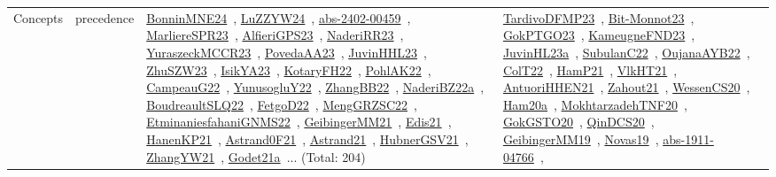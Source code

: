 {\begin{longtable}{lp{3cm}>{\raggedright\arraybackslash}p{6cm}>{\raggedright\arraybackslash}p{6cm}>{\raggedright\arraybackslash}p{8cm}}
Concepts & precedence & \href{../works/BonninMNE24.pdf}{BonninMNE24}~\cite{BonninMNE24}, \href{../works/LuZZYW24.pdf}{LuZZYW24}~\cite{LuZZYW24}, \href{../works/abs-2402-00459.pdf}{abs-2402-00459}~\cite{abs-2402-00459}, \href{../works/MarliereSPR23.pdf}{MarliereSPR23}~\cite{MarliereSPR23}, \href{../works/AlfieriGPS23.pdf}{AlfieriGPS23}~\cite{AlfieriGPS23}, \href{../works/NaderiRR23.pdf}{NaderiRR23}~\cite{NaderiRR23}, \href{../works/YuraszeckMCCR23.pdf}{YuraszeckMCCR23}~\cite{YuraszeckMCCR23}, \href{../works/PovedaAA23.pdf}{PovedaAA23}~\cite{PovedaAA23}, \href{../works/JuvinHHL23.pdf}{JuvinHHL23}~\cite{JuvinHHL23}, \href{../works/ZhuSZW23.pdf}{ZhuSZW23}~\cite{ZhuSZW23}, \href{../works/IsikYA23.pdf}{IsikYA23}~\cite{IsikYA23}, \href{../works/KotaryFH22.pdf}{KotaryFH22}~\cite{KotaryFH22}, \href{../works/PohlAK22.pdf}{PohlAK22}~\cite{PohlAK22}, \href{../works/CampeauG22.pdf}{CampeauG22}~\cite{CampeauG22}, \href{../works/YunusogluY22.pdf}{YunusogluY22}~\cite{YunusogluY22}, \href{../works/ZhangBB22.pdf}{ZhangBB22}~\cite{ZhangBB22}, \href{../works/NaderiBZ22a.pdf}{NaderiBZ22a}~\cite{NaderiBZ22a}, \href{../works/BoudreaultSLQ22.pdf}{BoudreaultSLQ22}~\cite{BoudreaultSLQ22}, \href{../works/FetgoD22.pdf}{FetgoD22}~\cite{FetgoD22}, \href{../works/MengGRZSC22.pdf}{MengGRZSC22}~\cite{MengGRZSC22}, \href{../works/EtminaniesfahaniGNMS22.pdf}{EtminaniesfahaniGNMS22}~\cite{EtminaniesfahaniGNMS22}, \href{../works/GeibingerMM21.pdf}{GeibingerMM21}~\cite{GeibingerMM21}, \href{../works/Edis21.pdf}{Edis21}~\cite{Edis21}, \href{../works/HanenKP21.pdf}{HanenKP21}~\cite{HanenKP21}, \href{../works/Astrand0F21.pdf}{Astrand0F21}~\cite{Astrand0F21}, \href{../works/Astrand21.pdf}{Astrand21}~\cite{Astrand21}, \href{../works/HubnerGSV21.pdf}{HubnerGSV21}~\cite{HubnerGSV21}, \href{../works/ZhangYW21.pdf}{ZhangYW21}~\cite{ZhangYW21}, \href{../works/Godet21a.pdf}{Godet21a}~\cite{Godet21a}... (Total: 204) & \href{../works/TardivoDFMP23.pdf}{TardivoDFMP23}~\cite{TardivoDFMP23}, \href{../works/Bit-Monnot23.pdf}{Bit-Monnot23}~\cite{Bit-Monnot23}, \href{../works/GokPTGO23.pdf}{GokPTGO23}~\cite{GokPTGO23}, \href{../works/KameugneFND23.pdf}{KameugneFND23}~\cite{KameugneFND23}, \href{../works/JuvinHL23a.pdf}{JuvinHL23a}~\cite{JuvinHL23a}, \href{../works/SubulanC22.pdf}{SubulanC22}~\cite{SubulanC22}, \href{../works/OujanaAYB22.pdf}{OujanaAYB22}~\cite{OujanaAYB22}, \href{../works/ColT22.pdf}{ColT22}~\cite{ColT22}, \href{../works/HamP21.pdf}{HamP21}~\cite{HamP21}, \href{../works/VlkHT21.pdf}{VlkHT21}~\cite{VlkHT21}, \href{../works/AntuoriHHEN21.pdf}{AntuoriHHEN21}~\cite{AntuoriHHEN21}, \href{../works/Zahout21.pdf}{Zahout21}~\cite{Zahout21}, \href{../works/WessenCS20.pdf}{WessenCS20}~\cite{WessenCS20}, \href{../works/Ham20a.pdf}{Ham20a}~\cite{Ham20a}, \href{../works/MokhtarzadehTNF20.pdf}{MokhtarzadehTNF20}~\cite{MokhtarzadehTNF20}, \href{../works/GokGSTO20.pdf}{GokGSTO20}~\cite{GokGSTO20}, \href{../works/QinDCS20.pdf}{QinDCS20}~\cite{QinDCS20}, \href{../works/GeibingerMM19.pdf}{GeibingerMM19}~\cite{GeibingerMM19}, \href{../works/Novas19.pdf}{Novas19}~\cite{Novas19}, \href{../works/abs-1911-04766.pdf}{abs-1911-04766}~\cite{abs-1911-04766}, 
\end{longtable}}

